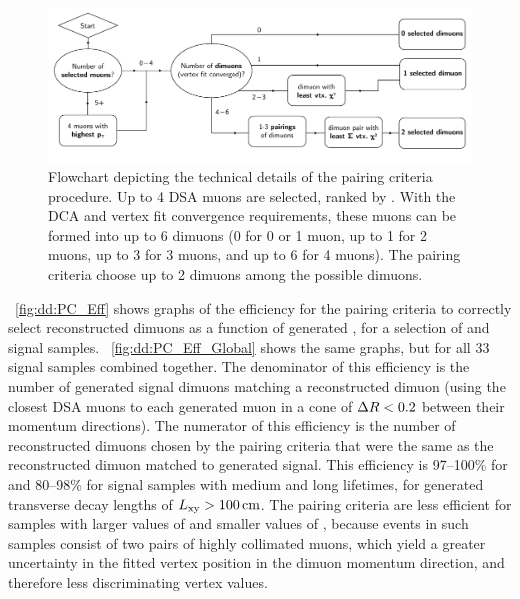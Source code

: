 \begin{figure}[htpb]
  \centering
  \includegraphics[width=\textwidth]{figures/displaced/PairingCriteriaAlgorithm.pdf}
  \caption{Flowchart depicting the technical details of the pairing criteria procedure. Up to 4 DSA muons are selected, ranked by \pT. With the DCA and vertex fit convergence requirements, these muons can be formed into up to 6 dimuons (0 for 0 or 1 muon, up to 1 for 2 muons, up to 3 for 3 muons, and up to 6 for 4 muons). The pairing criteria choose up to 2 dimuons among the possible dimuons.}
  \label{fig:dd:pca}
\end{figure}

\Fig~\ref{fig:dd:PC_Eff} shows graphs of the efficiency for the pairing criteria to correctly select reconstructed dimuons as a function of generated \Lxy, for a selection of \twoMu and \fourMu signal samples.
\Fig~\ref{fig:dd:PC_Eff_Global} shows the same graphs, but for all 33 signal samples combined together.
The denominator of this efficiency is the number of generated signal dimuons matching a reconstructed dimuon (using the closest DSA muons to each generated muon in a cone of $\Delta R < 0.2$ between their momentum directions).
The numerator of this efficiency is the number of reconstructed dimuons chosen by the pairing criteria that were the same as the reconstructed dimuon matched to generated signal.
This efficiency is 97--100\% for \twoMu and 80--98\% for \fourMu signal samples with medium and long lifetimes, for generated transverse decay lengths of $L_{\mathrm{xy}} > 100 \,\text{cm}$.
The pairing criteria are less efficient for \fourMu samples with larger values of \mH and smaller values of \mX, because events in such samples consist of two pairs of highly collimated muons, which yield a greater uncertainty in the fitted vertex position in the dimuon momentum direction, and therefore less discriminating vertex \chisq values.

